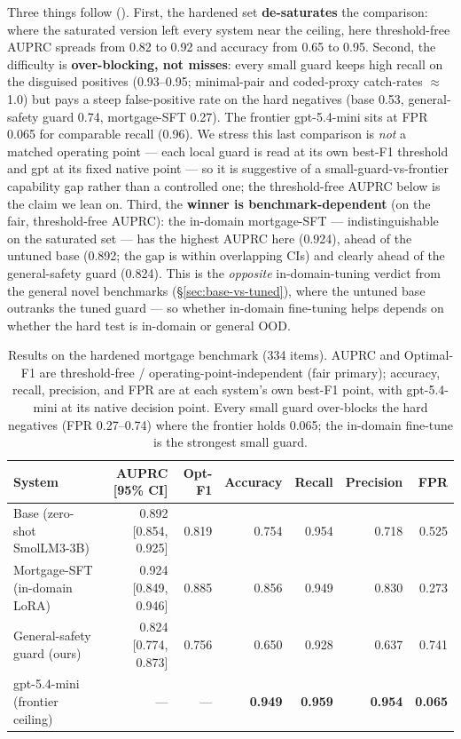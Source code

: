 \documentclass[sigconf,nonacm]{acmart}
\begin{document}
Three things follow (). First, the hardened set \textbf{de-saturates} the comparison: where the saturated version left every system near the ceiling, here threshold-free AUPRC spreads from 0.82 to 0.92 and accuracy from 0.65 to 0.95. Second, the difficulty is \textbf{over-blocking, not misses}: every small guard keeps high recall on the disguised positives (0.93--0.95; minimal-pair and coded-proxy catch-rates $\approx$1.0) but pays a steep false-positive rate on the hard negatives (base 0.53, general-safety guard 0.74, mortgage-SFT 0.27). The frontier gpt-5.4-mini sits at FPR 0.065 for comparable recall (0.96). We stress this last comparison is \emph{not} a matched operating point --- each local guard is read at its own best-F1 threshold and gpt at its fixed native point --- so it is suggestive of a small-guard-vs-frontier capability gap rather than a controlled one; the threshold-free AUPRC below is the claim we lean on. Third, the \textbf{winner is benchmark-dependent} (on the fair, threshold-free AUPRC): the in-domain mortgage-SFT --- indistinguishable on the saturated set --- has the highest AUPRC here (0.924), ahead of the untuned base (0.892; the gap is within overlapping CIs) and clearly ahead of the general-safety guard (0.824). This is the \emph{opposite} in-domain-tuning verdict from the general novel benchmarks (\S\ref{sec:base-vs-tuned}), where the untuned base outranks the tuned guard --- so whether in-domain fine-tuning helps depends on whether the hard test is in-domain or general OOD.

\begin{table}[t]
\centering
\small
\caption{Results on the hardened mortgage benchmark (334 items). AUPRC and Optimal-F1 are threshold-free / operating-point-independent (fair primary); accuracy, recall, precision, and FPR are at each system's own best-F1 point, with gpt-5.4-mini at its native decision point. Every small guard over-blocks the hard negatives (FPR 0.27--0.74) where the frontier holds 0.065; the in-domain fine-tune is the strongest small guard.}
\label{tab:mortgage-casestudy}
\begin{tabular}{lrrrrrr}
\toprule
System & AUPRC [95\% CI] & Opt-F1 & Accuracy & Recall & Precision & FPR \\
\midrule
Base (zero-shot SmolLM3-3B) & 0.892 [0.854, 0.925] & 0.819 & 0.754 & 0.954 & 0.718 & 0.525 \\
Mortgage-SFT (in-domain LoRA) & 0.924 [0.849, 0.946] & 0.885 & 0.856 & 0.949 & 0.830 & 0.273 \\
General-safety guard (ours) & 0.824 [0.774, 0.873] & 0.756 & 0.650 & 0.928 & 0.637 & 0.741 \\
gpt-5.4-mini (frontier ceiling) & --- & --- & \textbf{0.949} & \textbf{0.959} & \textbf{0.954} & \textbf{0.065} \\
\bottomrule
\end{tabular}
\end{table}
\end{document}

